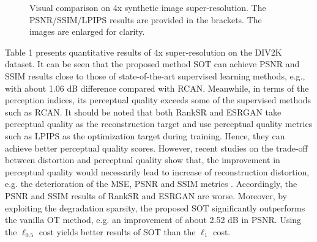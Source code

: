 \documentclass[10pt,journal,compsoc]{IEEEtran}
\begin{document}
\begin{figure}[!t]
	\centering
	\caption{Visual comparison on 4x synthetic image super-resolution. The PSNR/SSIM/LPIPS results are provided in the brackets. The images are enlarged for clarity.}
	\label{figure1}
\end{figure}


Table 1 presents quantitative results of 4x super-resolution 
on the DIV2K dataset. It can be seen that the proposed method SOT
can achieve PSNR and SSIM results close to those of state-of-the-art 
supervised learning methods, e.g., with about 1.06 dB difference 
compared with RCAN. Meanwhile, in terms of the perception indices,
its perceptual quality exceeds some of the supervised methods 
such as RCAN. It should be noted that both RankSR and ESRGAN
take perceptual quality as the reconstruction target and 
use perceptual quality metrics such as LPIPS as the optimization 
target during training. Hence, they can achieve 
better perceptual quality scores. 
However, recent studies on the trade-off between distortion and 
perceptual quality show that, the improvement in perceptual quality 
would necessarily lead to increase of reconstruction distortion, 
e.g. the deterioration of the MSE, PSNR and SSIM metrics 
\cite{blau2019rethinking,yan2021perceptual}. Accordingly, 
the PSNR and SSIM results of RankSR and ESRGAN are worse. 
Moreover, by exploiting the degradation sparsity,
the proposed SOT significantly outperforms the
vanilla OT method, e.g. an improvement of about 2.52 dB in PSNR. 
Using the $\ell_{0.5}$ cost yields better results of SOT than the
$\ell_{1}$ cost.

\end{document}
